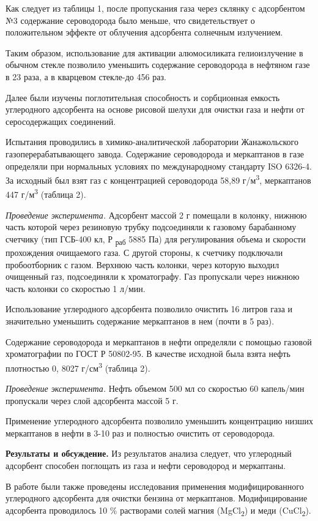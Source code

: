 \begin{multicols}{2}
Как следует из таблицы 1, после пропускания газа через склянку с
адсорбентом №3 содержание сероводорода было меньше, что свидетельствует
о положительном эффекте от облучения адсорбента солнечным излучением.

Таким образом, использование для активации алюмосиликата гелиоизлучение
в обычном стекле позволило уменьшить содержание сероводорода в нефтяном
газе в 23 раза, а в кварцевом стекле-до 456 раз.

Далее были изучены поглотительная способность и сорбционная емкость
углеродного адсорбента на основе рисовой шелухи для очистки газа и нефти
от серосодержащих соединений.

Испытания проводились в химико-аналитической лаборатории Жанажольского
газоперерабатывающего завода. Содержание сероводорода и меркаптанов в
газе определяли при нормальных условиях по международному стандарту ISO
6326-4. За исходный был взят газ с концентрацией сероводорода 58,89
г/м\textsuperscript{3}, меркаптанов 447 г/м\textsuperscript{3} (таблица
2).

\emph{Проведение эксперимента.} Адсорбент массой 2 г помещали в колонку,
нижнюю часть которой через резиновую трубку подсоединяли к газовому
барабанному счетчику (тип ГСБ-400 кл, Р \textsubscript{раб} 5885 Па) для
регулирования объема и скорости прохождения очищаемого газа. С другой
стороны, к счетчику подключали пробоотборник с газом. Верхнюю часть
колонки, через которую выходил очищенный газ, подсоединяли к
хроматографу. Газ пропускали через нижнюю часть колонки со скоростью 1
л/мин.

Использование углеродного адсорбента позволило очистить 16 литров газа и
значительно уменьшить содержание меркаптанов в нем (почти в 5 раз).

Содержание сероводорода и меркаптанов в нефти определяли с помощью
газовой хроматографии по ГОСТ Р 50802-95. В качестве исходной была взята
нефть плотностью 0, 8027 г/см\textsuperscript{3} (таблица 2).

\emph{Проведение эксперимента.} Нефть объемом 500 мл со скоростью 60
капель/мин пропускали через слой адсорбента массой 5 г.

Применение углеродного адсорбента позволило уменьшить концентрацию
низших меркаптанов в нефти в 3-10 раз и полностью очистить от
сероводорода.

{\bfseries Результаты и обсуждение.} Из результатов анализа следует, что
углеродный адсорбент способен поглощать из газа и нефти сероводород и
меркаптаны.

В работе были также проведены исследования применения модифицированного
углеродного адсорбента для очистки бензина от меркаптанов.
Модифицирование адсорбента проводилось 10 \% растворами солей магния
(MgCl\textsubscript{2}) и меди (CuCl\textsubscript{2}).
\end{multicols}

